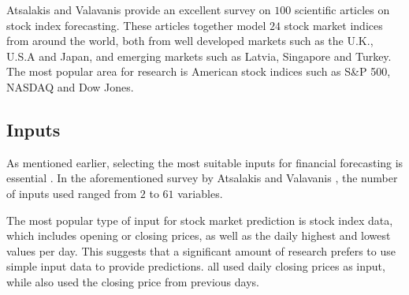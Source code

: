 \documentclass{UoYCSproject}
\begin{document}
Atsalakis and Valavanis \cite{atsalakis2009surveying} provide an excellent survey on $100$ scientific articles on stock index forecasting. These articles together model $24$ stock market indices from around the world, both from well developed markets such as the U.K., U.S.A and Japan, and emerging markets such as Latvia, Singapore and Turkey. The most popular area for research is American stock indices such as S\&P 500, NASDAQ and Dow Jones.

\subsection{Inputs}
As mentioned earlier, selecting the most suitable inputs for financial forecasting is essential \cite{zhong2017forecasting}. In the aforementioned survey by Atsalakis and Valavanis \cite{atsalakis2009surveying}, the number of inputs used ranged from $2$ to $61$ variables. 

The most popular type of input for stock market prediction is stock index data, which includes opening or closing prices, as well as the daily highest and lowest values per day. This suggests that a significant amount of research prefers to use simple input data to provide predictions. \cite{barnes2000study, donaldson1999neural, halliday2004equity, tan1995conservative, pai2005hybrid, pantazopoulos1998financial} all used daily closing prices as input, while \cite{andreou2000testing, fernandez2000profitability, pan2005predicting,tang2002web} also used the closing price from previous days. 
\end{document}
